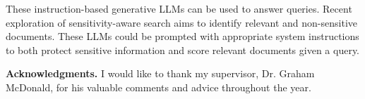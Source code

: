 These instruction-based generative LLMs can be used to answer queries. Recent exploration of sensitivity-aware search \cite{mcdonald2021search} aims to identify relevant and non-sensitive documents. These LLMs could be prompted with appropriate system instructions to both protect sensitive information and score relevant documents given a query.

\vspace{0.4cm}
{\bf Acknowledgments.}
I would like to thank my supervisor, Dr. Graham McDonald, for his valuable comments and advice throughout the year.


